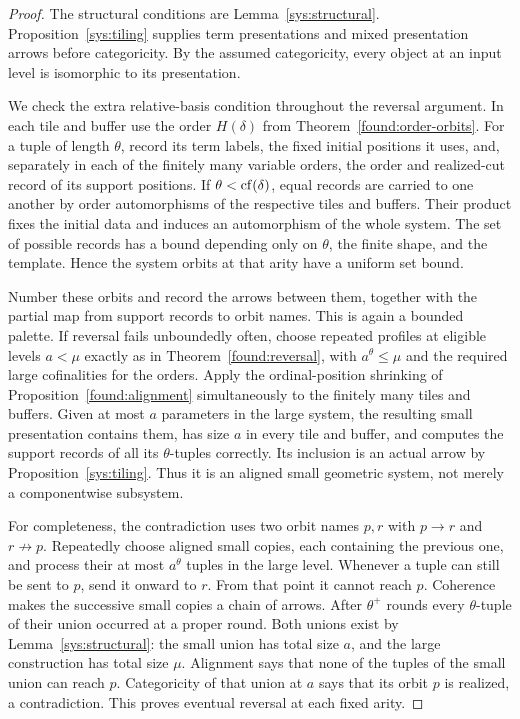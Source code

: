 \begin{proof}
The structural conditions are Lemma~\ref{sys:structural}.
Proposition~\ref{sys:tiling} supplies term presentations and mixed
presentation arrows before categoricity.  By the assumed
categoricity, every object at an input level is isomorphic to its
presentation.

We check the extra relative-basis condition throughout the reversal
argument.  In each tile and buffer use the order $H(\delta)$ from
Theorem~\ref{found:order-orbits}.  For a tuple of length $\theta$, record
its term labels, the fixed initial positions it uses, and, separately
in each of the finitely many variable orders, the order and
realized-cut record of its support positions.  If
$\theta<\operatorname{cf}(\delta)$, equal records are carried to one another by
order automorphisms of the respective tiles and buffers.  Their
product fixes the initial data and induces an automorphism of the
whole system.  The set of possible records has a bound depending
only on $\theta$, the finite shape, and the template.  Hence the
system orbits at that arity have a uniform set bound.

Number these orbits and record the arrows between them, together
with the partial map from support records to orbit names.  This is
again a bounded palette.  If reversal fails unboundedly often,
choose repeated profiles at eligible levels $a<\mu$ exactly as in
Theorem~\ref{found:reversal}, with $a^\theta\leq\mu$ and the required
large cofinalities for the orders.  Apply the ordinal-position
shrinking of Proposition~\ref{found:alignment} simultaneously to the
finitely many tiles and buffers.  Given at most $a$ parameters in
the large system, the resulting small presentation contains them,
has size $a$ in every tile and buffer, and computes the support
records of all its $\theta$-tuples correctly.  Its inclusion is an
actual arrow by Proposition~\ref{sys:tiling}.  Thus it is an aligned
small geometric system, not merely a componentwise subsystem.

For completeness, the contradiction uses two orbit names $p,r$ with
$p\to r$ and $r\not\to p$.  Repeatedly choose aligned small copies,
each containing the previous one, and process their at most
$a^\theta$ tuples in the large level.  Whenever a tuple can still be
sent to $p$, send it onward to $r$.  From that point it cannot reach
$p$.  Coherence makes the successive small copies a chain of
arrows.  After $\theta^+$ rounds every $\theta$-tuple of their union
occurred at a proper round.  Both unions exist by
Lemma~\ref{sys:structural}: the small union has total size $a$, and
the large construction has total size $\mu$.  Alignment says that
none of the tuples of the small union can reach $p$.  Categoricity
of that union at $a$ says that its orbit $p$ is realized, a
contradiction.  This proves eventual reversal at each fixed arity.


\end{proof}
